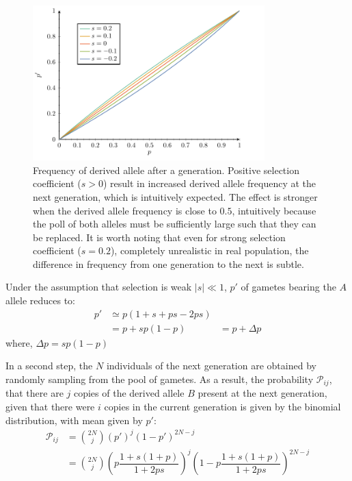 \begin{figure}[H]
    \centering
    \includegraphics[width=0.8\textwidth, page=1] {figures.pdf}
    \caption[Frequency of derived {allele} after a generation]{
    Frequency of derived \gls{allele} after a generation.
    Positive selection coefficient ($s > 0$) result in increased derived \gls{allele} frequency at the next generation, which is intuitively expected.
    The effect is stronger when the derived \gls{allele} frequency is close to $0.5$, intuitively because the poll of both \glspl{allele} must be sufficiently large such that they can be replaced.
    It is worth noting that even for strong selection coefficient ($s=0.2$), completely unrealistic in real population, the difference in frequency from one generation to the next is subtle.}
\end{figure}

Under the assumption that selection is weak $|s| \ll 1$,  $p'$ of gametes bearing the $A$ allele reduces to:
\begin{align}
    p' & \simeq p (1 + s + ps - 2ps) \\
    & = p + sp(1-p)
    & = p + \Delta p
\end{align}
where, $\Delta p = sp(1-p)$

In a second step, the $N$ individuals of the next generation are obtained by randomly sampling from the pool of gametes.
As a result, the probability $\mathcal{P}_{ij}$, that there are $j$ copies of the derived allele $B$ present at the next generation, given that there were $i$ copies in the current generation is given by the binomial distribution, with mean given by $p'$:
\begin{align}
    \mathcal{P}_{ij} & = \binom{2 N}{j} \left( p' \right)^j \left(1 - p' \right)^{2 N -j} \\
    & = \binom{2 N}{j} \left( p\dfrac{1+s(1+p)}{1 + 2ps} \right)^j \left(1 - p\dfrac{1+s(1+p)}{1 + 2ps} \right)^{2 N -j} \label{eq:binomial-WF}
\end{align}

